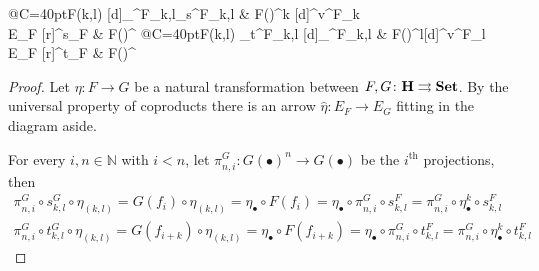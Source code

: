 \documentclass[3p]{elsarticle}
\newcommand{\Set}{\mathbf{Set}}
\def\E{\textbf {\textup{E}}}
\newcommand{\catname}[1]{\textbf{\textup{#1}}}
\theoremstyle{remark}
\theoremstyle{definition}
\begin{document}
\noindent 
\begin{minipage}[r]{.75\linewidth}
\equi*
\end{minipage}\hfill 
\begin{minipage}[l]{.25\linewidth}
	\xymatrix@R=10pt@C=40pt{F(k,l) \ar@{>->}[d]_{\iota^F_{k,l}}\ar[r]_{s^F_{k,l}} & F(\bullet)^k \ar@{>->}[d]^{v^F_k} \\ E_F ^{s_F} & F(\bullet)^\star}
	\xymatrix@R=10pt@C=40pt{F(k,l) \ar[r]_{t^F_{k,l}} \ar@{>->}[d]_{\iota^F_{k,l}} & F(\bullet)^l\ar@{>->}[d]^{v^F_l}  \\ E_F ^{t_F} & F(\bullet)^\star}
\end{minipage}

\begin{proof}\label{proof:equi}
	Let $\eta\colon F\rightarrow G$ be a natural transformation between $F, G\colon \catname{H}\rightrightarrows \Set$.  By the universal property of coproducts there is an arrow $\hat{\eta}\colon E_F\to E_G$ fitting in the diagram aside.
	
	\smallskip 
	\noindent 
	\begin{minipage}[r]{.8\linewidth}
		\setlength{\parindent}{1.5em}
		For every $i, n\in \mathbb{N}$ with $i< n$, let $\pi^G_{n, i}\colon G(\bullet)^n\to G(\bullet)$ be the $i^{\mathrm{th}}$ projections, then
		\begin{gather*}
			\pi^G_{n, i}\circ s^G_{k,l}\circ \eta_{(k,l)} = G(f_i)\circ \eta_{(k,l)} = \eta_\bullet \circ F(f_i) = \eta_\bullet \circ \pi^G_{n, i} \circ s^F_{k,l} = \pi^G_{n, i}\circ \eta^k_\bullet  \circ s^F_{k,l}\\
			\pi^G_{n, i}\circ t^G_{k,l}\circ \eta_{(k,l)} = G(f_{i+k})\circ \eta_{(k,l)} = \eta_\bullet \circ F(f_{i+k}) = \eta_\bullet \circ \pi^G_{n, i} \circ t^F_{k,l} = \pi^G_{n, i}\circ \eta^k_\bullet \circ  t^F_{k,l}
		\end{gather*}
	\end{minipage}
	\hfill
	\begin{minipage}[l]{.15\linewidth} \vspace{-.5cm}
	\end{minipage}


\end{proof}
\end{document}
